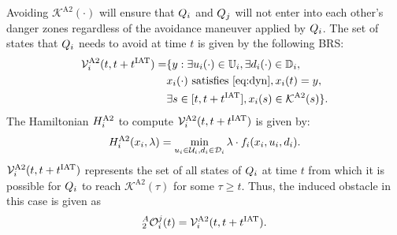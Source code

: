\begin{itemize}[leftmargin=*]
Avoiding $\mathcal{K}^{\text{A2}}(\cdot)$ will ensure that $Q_i$ and $Q_j$ will not enter into each other's danger zones regardless of the avoidance maneuver applied by $Q_i$. The set of states that $Q_i$ needs to avoid at time $t$ is given by the following BRS: 
\begin{equation} \label{eq:ObsBRS_case2_caseA}
\begin{aligned}
\brs^{\text{A2}}_{i}(t, t+\iat) = & \{y: \exists \ctrl_i(\cdot) \in \cfset_i, \exists \dstb_i(\cdot) \in \dfset_i, \\
& \state_i(\cdot) \text{ satisfies \eqref{eq:dyn}}, \state_i(t) = y, \\
& \exists s \in [t, t+\iat], \state_i(s) \in \mathcal{K}^{\text{A2}}(s) \}.
\end{aligned}
\end{equation}
The Hamiltonian $H^{\text{A2}}_{i}$ to compute $\mathcal{V}^{\text{A2}}_{i}(t, t+t^\text{IAT})$ is given by:
\begin{equation} \label{eqn:BRS_obsham_case2_caseA}
\ham^{\text{A2}}_{i}(\state_i, \costate) = \min_{\ctrl_i \in \cset_i, \dstb_i \in \dset_i} \costate \cdot f_i (\state_i, \ctrl_i, \dstb_i).
\end{equation}
$\mathcal{V}^{\text{A2}}_{i}(t, t+t^\text{IAT})$ represents the set of all states of $Q_i$ at time $t$ from which it is possible for $Q_i$ to reach $\mathcal{K}^{\text{A2}}(\tau)$ for some $\tau \geq t$. Thus, the induced obstacle in this case is given as
\begin{equation} \label{eq:intruderObs_case2_caseA}
_2^A\ioset_i^j(t) = \brs^{\text{A2}}_{i}(t, t+\iat).
\end{equation}


\end{itemize}
